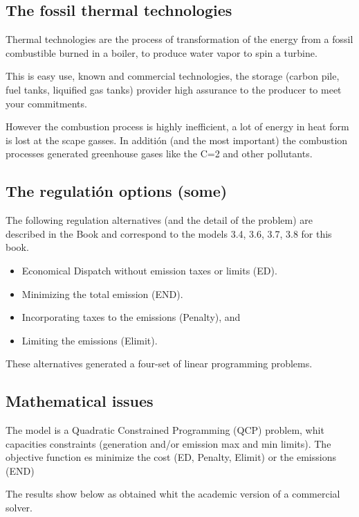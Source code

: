 \documentclass{article}
\begin{document}
\subsection{The fossil thermal technologies}

Thermal technologies are the process of transformation of the energy from a fossil combustible burned in a boiler, to produce water vapor to spin a turbine.

This is easy use, known and commercial technologies, the storage (carbon pile, fuel tanks, liquified gas tanks) provider high assurance to the producer to meet your commitments.

However the combustion process is highly inefficient, a lot of energy in heat form is lost at the scape gasses. In additión (and the most important) the combustion processes generated greenhouse gases like the C=2 and other pollutants.

\subsection{The regulatión options (some)}

The following regulation alternatives (and the detail of the problem) are described in the Book \cite{soroudi_power_2017} and correspond to the models 3.4, 3.6, 3.7, 3.8 for this book.

\begin{itemize}
\item Economical Dispatch without emission taxes or limits (ED). 
\item Minimizing the total emission (END).
\item Incorporating taxes to the emissions (Penalty), and 
\item Limiting the emissions (Elimit). 
\end{itemize}

These alternatives generated a four-set of linear programming problems.

\subsection{Mathematical issues}

The model is a Quadratic Constrained Programming (QCP) problem, whit capacities constraints (generation and/or emission max and min limits). The objective function es minimize the cost (ED, Penalty, Elimit) or the emissions (END)

The results show below as obtained whit the academic version of a commercial solver.
\end{document}
